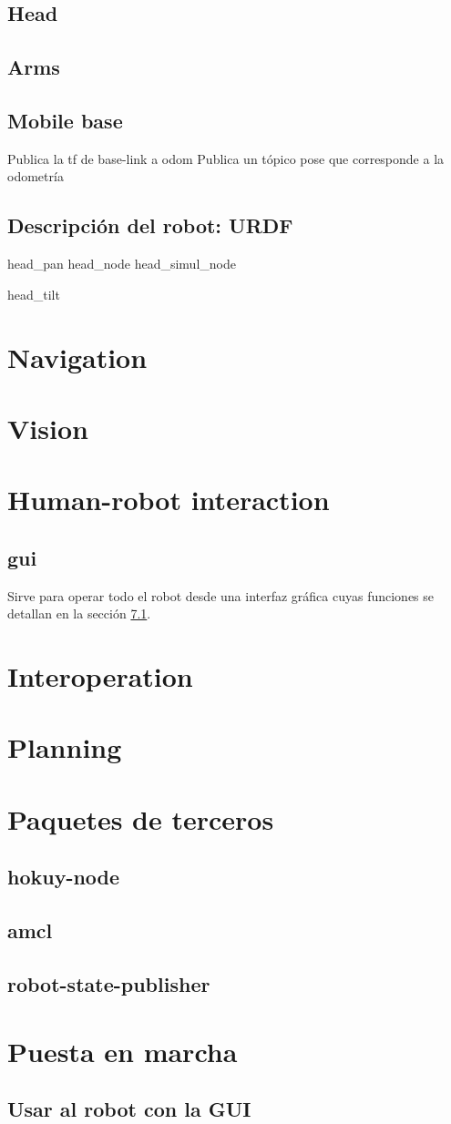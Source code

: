 \documentclass[a4paper,usenames,dvipsnames,svgnames,table]{book}
\begin{document}
\subsection{Head}

\subsection{Arms}

\subsection{Mobile base}
Publica la tf de base-link a odom
Publica un tópico pose que corresponde a la odometría
\subsection{Descripción del robot: URDF}
head\_pan        head\_node head\_simul\_node

head\_tilt

\section{Navigation}


\section{Vision}
\section{Human-robot interaction}
\subsection{gui}
Sirve para operar todo el robot desde una interfaz gráfica cuyas funciones se detallan en la sección \ref{sec:GUI}.
\section{Interoperation}

\section{Planning}

\section{Paquetes de terceros}
\subsection{hokuy-node}
\subsection{amcl}
\subsection{robot-state-publisher}

\section{Puesta en marcha}
\subsection{Usar al robot con la GUI}
\label{sec:GUI}
\end{document}
